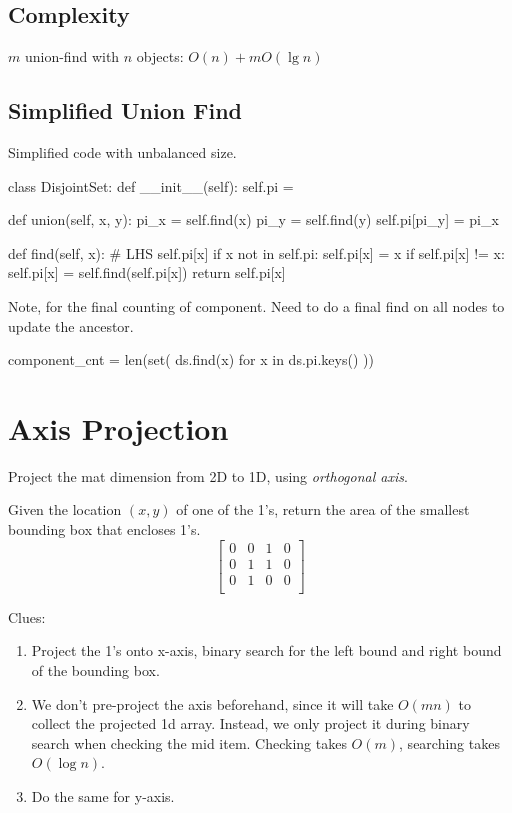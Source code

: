 \subsection{Complexity}
$m$ union-find with $n$ objects: $O(n)+m O(\lg n)$

\subsection{Simplified Union Find}
Simplified code with unbalanced size. 
\begin{python}
class DisjointSet:
    def __init__(self):
        self.pi = {}

    def union(self, x, y):
        pi_x = self.find(x)
        pi_y = self.find(y)
        self.pi[pi_y] = pi_x

    def find(self, x):
        # LHS self.pi[x]
        if x not in self.pi:
            self.pi[x] = x
        if self.pi[x] != x:
            self.pi[x] = self.find(self.pi[x])
        return self.pi[x]
\end{python}

Note, for the final counting of component. Need to do a final find on all nodes to
update the ancestor.
\begin{python}
component_cnt = len(set(
    ds.find(x)
    for x in ds.pi.keys()
))
\end{python}

\section{Axis Projection}
Project the mat dimension from 2D to 1D, using \textit{orthogonal axis}.

 Given the location $(x, y)$ of one of the 1's, return the area of the smallest bounding box that encloses 1's.
$$
\begin{bmatrix}
0& 0& 1& 0 \\
0& 1& 1& 0 \\
0& 1& 0& 0 \\
\end{bmatrix}
$$

Clues:
\begin{enumerate}
\item Project the 1's onto x-axis, binary search for the left bound and right bound of the bounding box. 
\item We don't pre-project the axis beforehand, since it will take $O(mn)$ to collect the projected 1d array. Instead, we only project it during binary search when checking the mid item. Checking takes $O(m)$, searching takes $O(\log n)$. 
\item Do the same for y-axis.
\end{enumerate}

